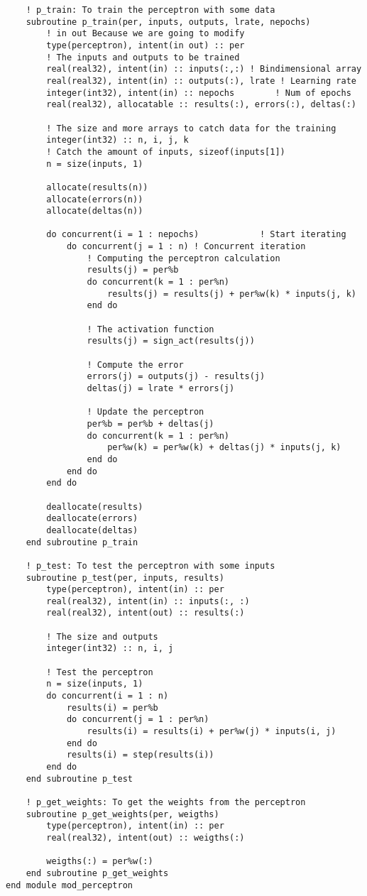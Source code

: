 \begin{lstlisting}
    ! p_train: To train the perceptron with some data
    subroutine p_train(per, inputs, outputs, lrate, nepochs)
        ! in out Because we are going to modify
        type(perceptron), intent(in out) :: per 
        ! The inputs and outputs to be trained
        real(real32), intent(in) :: inputs(:,:) ! Bindimensional array
        real(real32), intent(in) :: outputs(:), lrate ! Learning rate
        integer(int32), intent(in) :: nepochs        ! Num of epochs
        real(real32), allocatable :: results(:), errors(:), deltas(:)

        ! The size and more arrays to catch data for the training
        integer(int32) :: n, i, j, k
        ! Catch the amount of inputs, sizeof(inputs[1])
        n = size(inputs, 1)     

        allocate(results(n))
        allocate(errors(n))
        allocate(deltas(n))
        
        do concurrent(i = 1 : nepochs)            ! Start iterating
            do concurrent(j = 1 : n) ! Concurrent iteration
                ! Computing the perceptron calculation
                results(j) = per%b
                do concurrent(k = 1 : per%n)
                    results(j) = results(j) + per%w(k) * inputs(j, k)
                end do
                
                ! The activation function
                results(j) = sign_act(results(j))

                ! Compute the error 
                errors(j) = outputs(j) - results(j)
                deltas(j) = lrate * errors(j)

                ! Update the perceptron
                per%b = per%b + deltas(j)
                do concurrent(k = 1 : per%n)
                    per%w(k) = per%w(k) + deltas(j) * inputs(j, k)
                end do
            end do
        end do

        deallocate(results)
        deallocate(errors)
        deallocate(deltas)
    end subroutine p_train

    ! p_test: To test the perceptron with some inputs
    subroutine p_test(per, inputs, results)
        type(perceptron), intent(in) :: per
        real(real32), intent(in) :: inputs(:, :)
        real(real32), intent(out) :: results(:)

        ! The size and outputs
        integer(int32) :: n, i, j
        
        ! Test the perceptron
        n = size(inputs, 1)
        do concurrent(i = 1 : n)
            results(i) = per%b
            do concurrent(j = 1 : per%n)
                results(i) = results(i) + per%w(j) * inputs(i, j)
            end do
            results(i) = step(results(i))
        end do
    end subroutine p_test

    ! p_get_weights: To get the weights from the perceptron
    subroutine p_get_weights(per, weigths)
        type(perceptron), intent(in) :: per
        real(real32), intent(out) :: weigths(:)
        
        weigths(:) = per%w(:)
    end subroutine p_get_weights
end module mod_perceptron
\end{lstlisting}
